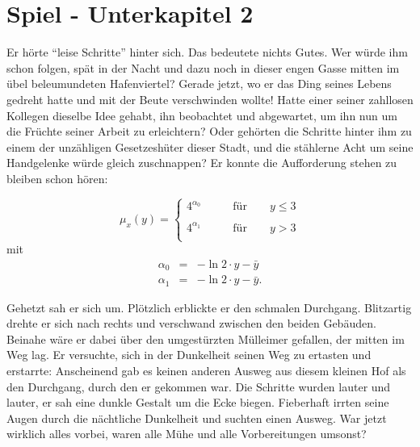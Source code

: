 \section{Spiel - Unterkapitel 2}
\label{Spiel_-_Unterkapitel_2}
%
Er hörte \enquote{leise Schritte} hinter sich. Das bedeutete
nichts Gutes. Wer würde ihm schon folgen, spät in der Nacht und
dazu noch in dieser engen Gasse mitten im übel beleumundeten
Hafenviertel? Gerade jetzt, wo er das Ding seines Lebens gedreht
hatte und mit der Beute verschwinden wollte! Hatte einer seiner
zahllosen Kollegen dieselbe Idee gehabt, ihn beobachtet und
abgewartet, um ihn nun um die Früchte seiner Arbeit zu
erleichtern? Oder gehörten die Schritte hinter ihm zu einem der
unzähligen Gesetzeshüter dieser Stadt, und die stählerne Acht um
seine Handgelenke würde gleich zuschnappen? Er konnte die
Aufforderung stehen zu bleiben schon hören:


    \begin{equation}
        \label{gleichung_nummer_1}
        \mu_{x}(y) = \left\{ \begin{array}{lll}
        4^{\alpha_0} & \qquad \textrm{für} \qquad y \leq 3\\
        \\
        4^{\alpha_1} & \qquad \textrm{für} \qquad y > 3\\
        \end{array} \right.
    \end{equation}
    mit
    \begin{eqnarray}
        \label{gleichung_nummer_2}
        \alpha_0 & = & -\ln 2 \cdot y - \bar{y}\\
        \alpha_1 & = & -\ln 2 \cdot y - \bar{y}\textrm{.}
    \end{eqnarray}



Gehetzt sah er sich um. Plötzlich erblickte er den schmalen
Durchgang. Blitzartig drehte er sich nach rechts und verschwand
zwischen den beiden Gebäuden. Beinahe wäre er dabei über den
umgestürzten Mülleimer gefallen, der mitten im Weg lag. Er
versuchte, sich in der Dunkelheit seinen Weg zu ertasten und
erstarrte: Anscheinend gab es keinen anderen Ausweg aus diesem
kleinen Hof als den Durchgang, durch den er gekommen war. Die
Schritte wurden lauter und lauter, er sah eine dunkle Gestalt um
die Ecke biegen. Fieberhaft irrten seine Augen durch die
nächtliche Dunkelheit und suchten einen Ausweg. War jetzt wirklich
alles vorbei, waren alle Mühe und alle Vorbereitungen umsonst?

